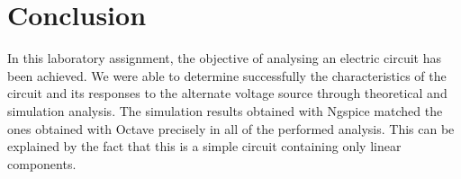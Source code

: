 \section{Conclusion}
\label{sec:conclusion}

In this laboratory assignment, the objective of analysing an electric circuit has been achieved. We were able to determine successfully the characteristics of the circuit and its responses to the alternate voltage source through theoretical and simulation analysis. The simulation results obtained with Ngspice matched the ones obtained with Octave precisely in all of the performed analysis. This can be explained by the fact that this is a simple circuit containing only linear components. 

